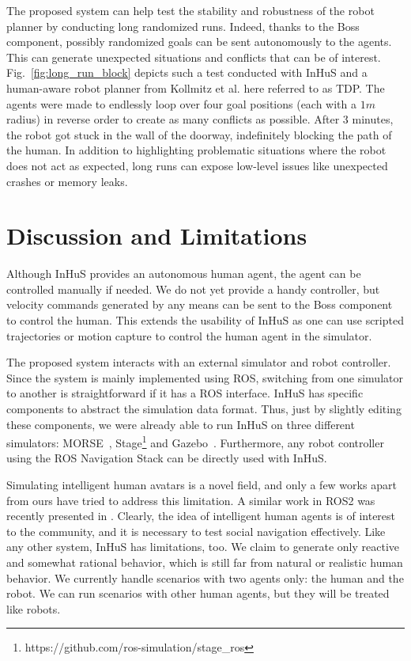 The proposed system can help test the stability and robustness of the robot planner by conducting long randomized runs. Indeed, thanks to the Boss component, possibly randomized goals can be sent autonomously to the agents. This can generate unexpected situations and conflicts that can be of interest.
Fig.~\ref{fig:long_run_block} depicts such a test conducted with InHuS and a human-aware robot planner from Kollmitz et al. \cite{kollmitz_time_2015} here referred to as TDP. The agents were made to endlessly loop over four goal positions (each with a $1m$ radius) in reverse order to create as many conflicts as possible. After 3 minutes, the robot got stuck in the wall of the doorway, indefinitely blocking the path of the human. In addition to highlighting problematic situations where the robot does not act as expected, long runs can expose low-level issues like unexpected crashes or memory leaks.




\section{Discussion and Limitations}

Although InHuS provides an autonomous human agent, the agent can be controlled manually if needed. We do not yet provide a handy controller, but velocity commands generated by any means can be sent to the Boss component to control the human. This extends the usability of InHuS as one can use scripted trajectories or motion capture to control the human agent in the simulator.

The proposed system interacts with an external simulator and robot controller. Since the system is mainly implemented using ROS, switching from one simulator to another is straightforward if it has a ROS interface. 
InHuS has specific components to abstract the simulation data format. Thus, just by slightly editing these components, we were already able to run InHuS on three different simulators: MORSE~\cite{echeverria2011modular}, Stage\footnote{https://github.com/ros-simulation/stage\_ros} and Gazebo~\cite{koenig2004design}. Furthermore, any robot controller using the ROS Navigation Stack can be directly used with InHuS.

Simulating intelligent human avatars is a novel field, and only a few works apart from ours have tried to address this limitation. A similar work in ROS2 was recently presented in \cite{perezhunavsim}.
Clearly, the idea of intelligent human agents is of interest to the community, and it is necessary to test social navigation effectively. Like any other system, InHuS has limitations, too. We claim to generate only reactive and somewhat rational behavior, which is still far from natural or realistic human behavior. We currently handle scenarios with two agents only: the human and the robot. We can run scenarios with other human agents, but they will be treated like robots.



